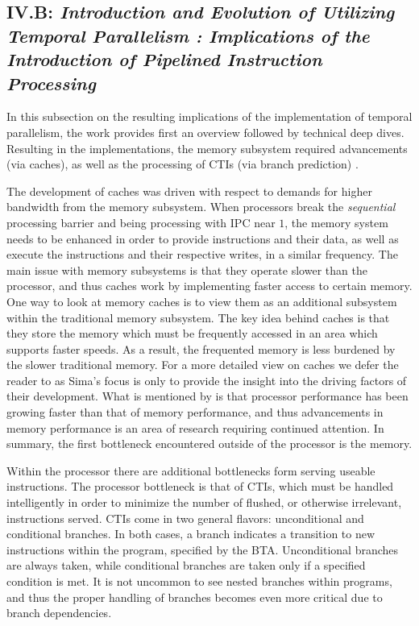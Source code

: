 \documentclass{article}
\begin{document}
\subsection{\textbf{IV.B}: \emph{Introduction and Evolution of Utilizing Temporal Parallelism : Implications of the Introduction of Pipelined Instruction Processing}}
In this subsection on the resulting implications of the implementation of temporal parallelism, the work provides first an overview followed by technical deep dives. 
Resulting in the implementations, the memory subsystem required advancements (via caches), as well as the processing of CTIs (via branch prediction) \cite{Sima}.

The development of caches was driven with respect to demands for higher bandwidth from the memory subsystem. 
When processors break the \emph{sequential} processing barrier and being processing with IPC near $1$, the memory system needs to be enhanced in order to provide instructions and their data, as well as execute the instructions and their respective writes, in a similar frequency. 
The main issue with memory subsystems is that they operate slower than the processor, and thus caches work by implementing faster access to certain memory. 
One way to look at memory caches is to view them as an additional subsystem within the traditional memory subsystem. 
The key idea behind caches is that they store the memory which must be frequently accessed in an area which supports faster speeds. 
As a result, the frequented memory is less burdened by the slower traditional memory.
For a more detailed view on caches we defer the reader to \cite[Section~6.3]{Bryant} as Sima's focus is only to provide the insight into the driving factors of their development. 
What is mentioned by \cite{Sima} is that processor performance has been growing faster than that of memory performance, and thus advancements in memory performance is an area of research requiring continued attention. 
In summary, the first bottleneck encountered outside of the processor is the memory. 

Within the processor there are additional bottlenecks form serving useable instructions. 
The processor bottleneck is that of CTIs, which must be handled intelligently in order to minimize the number of flushed, or otherwise irrelevant, instructions served. 
CTIs come in two general flavors: unconditional and conditional branches. 
In both cases, a branch indicates a transition to new instructions within the program, specified by the BTA. 
Unconditional branches are always taken, while conditional branches are taken only if a specified condition is met. 
It is not uncommon to see nested branches within programs, and thus the proper handling of branches becomes even more critical due to branch dependencies. 
\end{document}

